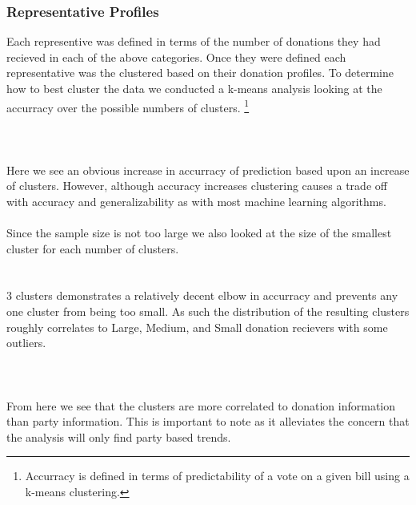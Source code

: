 \documentclass[journal]{IEEEtran}
\begin{document}
\subsubsection{Representative Profiles}
Each representive was defined in terms of the number of donations they had recieved in each of the above
categories. Once they were defined each representative was the clustered based on their donation profiles.
To determine how to best cluster the data we conducted a k-means analysis looking at the accurracy over the 
possible numbers of clusters.
\footnote{Accurracy is defined in terms of predictability of a vote on a given bill using a k-means clustering.}\\\\
\\
\\Here we see an obvious increase in accurracy of prediction based upon an increase of clusters. However, although accuracy increases
clustering causes a trade off with accuracy and generalizability as with most machine learning algorithms.\\\\
Since the sample size is not too large we also looked at the size of the smallest cluster for each number of clusters.\\
\\
\\3 clusters demonstrates a relatively decent elbow in accurracy and prevents any one cluster from being too small. As such
the distribution of the resulting clusters roughly correlates to Large, Medium, and Small donation recievers with some outliers.\\\\
\\\\
From here we see that the clusters are more correlated to donation information than party information. This is important to note
as it alleviates the concern that the analysis will only find party based trends.
\end{document}
